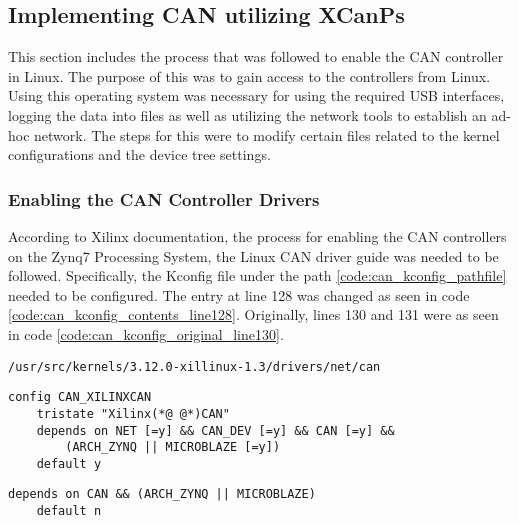 \subsection{Implementing CAN utilizing XCanPs}\label{sec:methods_to_implement_can}

This section includes the process that was followed to enable the CAN controller in Linux.
The purpose of this was to gain access to the controllers from Linux.
Using this operating system was necessary for using the required USB interfaces, logging the data into files as well as utilizing the network tools to establish an ad-hoc network.
The steps for this were to modify certain files related to the kernel configurations and the device tree settings.

\subsubsection*{Enabling the CAN Controller Drivers}

According to Xilinx documentation, the process for enabling the CAN controllers on the Zynq7 Processing System, the Linux CAN driver guide \cite{Xilinx_wiki_Linux_CAN_driver} was needed to be followed.
Specifically, the Kconfig file under the path \ref{code:can_kconfig_pathfile} needed to be configured.
The entry at line 128 was changed as seen in code \ref{code:can_kconfig_contents_line128}.
Originally, lines 130 and 131 were as seen in code \ref{code:can_kconfig_original_line130}.

\begin{lstlisting}[caption={CAN Kconfig pathfile.},numbers=none,label=code:can_kconfig_pathfile]
/usr/src/kernels/3.12.0-xillinux-1.3/drivers/net/can
\end{lstlisting}

\begin{lstlisting}[firstnumber=128,caption={Kconfig file contents from line 128.},label={code:can_kconfig_contents_line128}]
config CAN_XILINXCAN
	tristate "Xilinx(*@ @*)CAN"
	depends on NET [=y] && CAN_DEV [=y] && CAN [=y] && 
        (ARCH_ZYNQ || MICROBLAZE [=y])
	default y
\end{lstlisting}

\begin{lstlisting}[firstnumber=130,caption={Original content of lines 130 and 131.},label={code:can_kconfig_original_line130}]
	depends on CAN && (ARCH_ZYNQ || MICROBLAZE)
	default n
\end{lstlisting}

